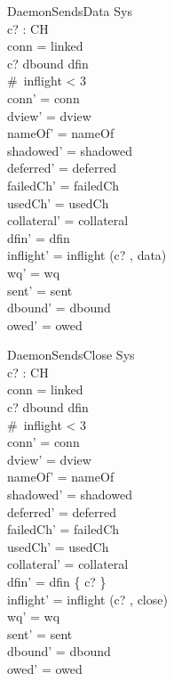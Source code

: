 \documentclass[a4paper,10pt,fleqn]{article}
\begin{document}
\begin{schema}{DaemonSendsData}
  \Delta Sys \\
  c? : CH \\
\where
  conn = linked \\
  c? \in \dom dbound \setminus dfin \\
  \#~inflight < 3 \\
  conn' = conn \\
  dview' = dview \\
  nameOf' = nameOf \\
  shadowed' = shadowed \\
  deferred' = deferred \\
  failedCh' = failedCh \\
  usedCh' = usedCh \\
  collateral' = collateral \\
  dfin' = dfin \\
  inflight' = inflight \cat \langle (c? , data) \rangle \\
  wq' = wq \\
  sent' = sent \\
  dbound' = dbound \\
  owed' = owed
\end{schema}

\begin{schema}{DaemonSendsClose}
  \Delta Sys \\
  c? : CH \\
\where
  conn = linked \\
  c? \in \dom dbound \setminus dfin \\
  \#~inflight < 3 \\
  conn' = conn \\
  dview' = dview \\
  nameOf' = nameOf \\
  shadowed' = shadowed \\
  deferred' = deferred \\
  failedCh' = failedCh \\
  usedCh' = usedCh \\
  collateral' = collateral \\
  dfin' = dfin \cup \{ c? \} \\
  inflight' = inflight \cat \langle (c? , close) \rangle \\
  wq' = wq \\
  sent' = sent \\
  dbound' = dbound \\
  owed' = owed
\end{schema}
\end{document}
